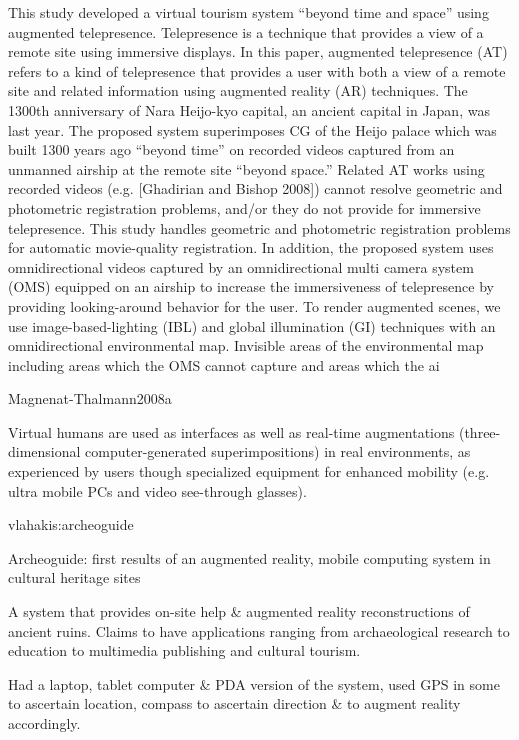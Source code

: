 This study developed a virtual tourism system “beyond time and
space” using augmented telepresence. Telepresence is a technique
that provides a view of a remote site using immersive displays. In
this paper, augmented telepresence (AT) refers to a kind of telepresence
that provides a user with both a view of a remote site and
related information using augmented reality (AR) techniques.
The 1300th anniversary of Nara Heijo-kyo capital, an ancient capital
in Japan, was last year. The proposed system superimposes
CG of the Heijo palace which was built 1300 years ago “beyond
time” on recorded videos captured from an unmanned airship at
the remote site “beyond space.” Related AT works using recorded
videos (e.g. [Ghadirian and Bishop 2008]) cannot resolve geometric
and photometric registration problems, and/or they do not provide
for immersive telepresence. This study handles geometric and
photometric registration problems for automatic movie-quality registration.
In addition, the proposed system uses omnidirectional
videos captured by an omnidirectional multi camera system (OMS)
equipped on an airship to increase the immersiveness of telepresence
by providing looking-around behavior for the user. To render
augmented scenes, we use image-based-lighting (IBL) and global
illumination (GI) techniques with an omnidirectional environmental
map. Invisible areas of the environmental map including areas
which the OMS cannot capture and areas which the ai


Magnenat-Thalmann2008a

Virtual humans are used as interfaces as well as real-time augmentations (three-dimensional computer-generated superimpositions) in real environments, as experienced by users though specialized equipment for enhanced mobility (e.g. ultra mobile PCs and video see-through glasses).


vlahakis:archeoguide

Archeoguide: first results of an augmented reality, mobile computing system in cultural heritage sites

A system that provides on-site help & augmented reality reconstructions of ancient ruins. Claims to have
applications ranging from archaeological research to education to multimedia publishing and cultural
tourism.
        
Had a laptop, tablet computer & PDA version of the system, used GPS in some to ascertain location, compass
to ascertain direction & to augment reality accordingly.

